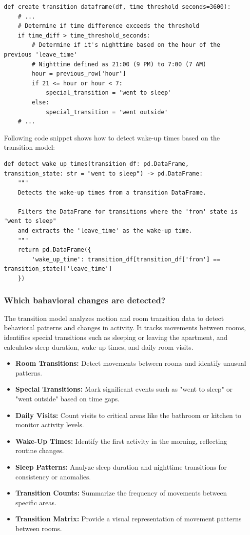 \documentclass[A4,10pt]{article}
\begin{document}
\begin{verbatim}
def create_transition_dataframe(df, time_threshold_seconds=3600):
	# ...
	# Determine if time difference exceeds the threshold
	if time_diff > time_threshold_seconds:
		# Determine if it's nighttime based on the hour of the previous 'leave_time'
		# Nighttime defined as 21:00 (9 PM) to 7:00 (7 AM)
		hour = previous_row['hour']
		if 21 <= hour or hour < 7:
			special_transition = 'went to sleep'
		else:
			special_transition = 'went outside'
	# ...
\end{verbatim}

Following code snippet shows how to detect wake-up times based on the transition model:

\begin{verbatim}
def detect_wake_up_times(transition_df: pd.DataFrame, transition_state: str = "went to sleep") -> pd.DataFrame:
    """
    Detects the wake-up times from a transition DataFrame.

    Filters the DataFrame for transitions where the 'from' state is "went to sleep"
    and extracts the 'leave_time' as the wake-up time.
    """
    return pd.DataFrame({
        'wake_up_time': transition_df[transition_df['from'] == transition_state]['leave_time']
    })
\end{verbatim}

\subsubsection{Which bahavioral changes are detected?}

The transition model analyzes motion and room transition data to detect behavioral patterns and changes in activity. It tracks movements between rooms, identifies special transitions such as sleeping or leaving the apartment, and calculates sleep duration, wake-up times, and daily room visits.

\begin{itemize}
    \item \textbf{Room Transitions:} Detect movements between rooms and identify unusual patterns.
    \item \textbf{Special Transitions:} Mark significant events such as "went to sleep" or "went outside" based on time gaps.
    \item \textbf{Daily Visits:} Count visits to critical areas like the bathroom or kitchen to monitor activity levels.
    \item \textbf{Wake-Up Times:} Identify the first activity in the morning, reflecting routine changes.
    \item \textbf{Sleep Patterns:} Analyze sleep duration and nighttime transitions for consistency or anomalies.
    \item \textbf{Transition Counts:} Summarize the frequency of movements between specific areas.
    \item \textbf{Transition Matrix:} Provide a visual representation of movement patterns between rooms.
\end{itemize}
\end{document}

